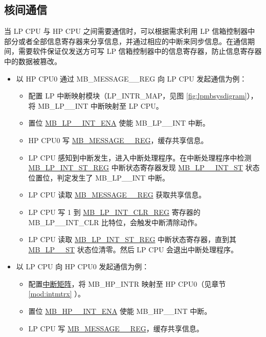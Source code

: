\documentclass[main\_\_CN.tex]{subfiles}
\begin{document}
\subsection{核间通信}
当 LP CPU 与 HP CPU 之间需要通信时，可以根据需求利用 LP 信箱控制器中部分或者全部信息寄存器来分享信息，并通过相应的中断来同步信息。在通信期间，需要软件保证仅发送方可写 LP 信箱控制器中的信息寄存器，防止信息寄存器中的数据被篡改。
\begin{itemize}
    \item 以 HP CPU0 通过 MB\_MESSAGE\_\_REG 向 LP CPU 发起通信为例：
    \begin{itemize}
        \item 配置 LP 中断映射模块（LP\_INTR\_MAP，见图 \ref{fig:lpmbsysdigram}），将 MB\_LP\_\_INT 中断映射至 LP CPU。
        \item 置位 \hyperref[fielddesc:MBLP0INTENA]{MB\_LP\_\_INT\_ENA} 使能 MB\_LP\_\_INT 中断。
        \item HP CPU0 写 \hyperref[regdesc:MBMESSAGE0REG]{MB\_MESSAGE\_\_REG}，缓存共享信息。
        \item LP CPU 感知到中断发生，进入中断处理程序。在中断处理程序中检测 \hyperref[regdesc:MBLPINTSTREG]{MB\_LP\_INT\_ST\_REG} 中断状态寄存器发现 \hyperref[fielddesc:MBLP0INTST]{MB\_LP\_\_INT\_ST} 状态位置位，判定发生了 MB\_LP\_\_INT 中断。
        \item LP CPU 读取 \hyperref[regdesc:MBMESSAGE0REG]{MB\_MESSAGE\_\_REG} 获取共享信息。
        \item LP CPU 写 1 到 \hyperref[regdesc:MBLPINTCLRREG]{MB\_LP\_INT\_CLR\_REG} 寄存器的 {MB\_LP\_\_INT\_CLR} 比特位，会触发中断清除动作。
        \item LP CPU 读取 \hyperref[regdesc:MBLPINTSTREG]{MB\_LP\_INT\_ST\_REG} 中断状态寄存器，直到其 \hyperref[fielddesc:MBLP0INTST]{MB\_LP\_\_ST} 状态位清零。然后 LP CPU 会退出中断处理程序。
    \end{itemize}
    \item 以 LP CPU 向 HP CPU0 发起通信为例：
    \begin{itemize}
        \item 配置\hyperref[mod:intmtrx]{中断矩阵}，将 MB\_HP\_INTR 映射至 HP CPU0（见章节 \ref{mod:intmtrx} \textit{}）。
        \item 置位 \hyperref[fielddesc:MBHP0INTENA]{MB\_HP\_\_INT\_ENA} 使能 MB\_HP\_\_INT 中断。
        \item LP CPU 写 \hyperref[regdesc:MBMESSAGE0REG]{MB\_MESSAGE\_\_REG}，缓存共享信息。

\end{itemize}
\end{itemize}
\end{document}
